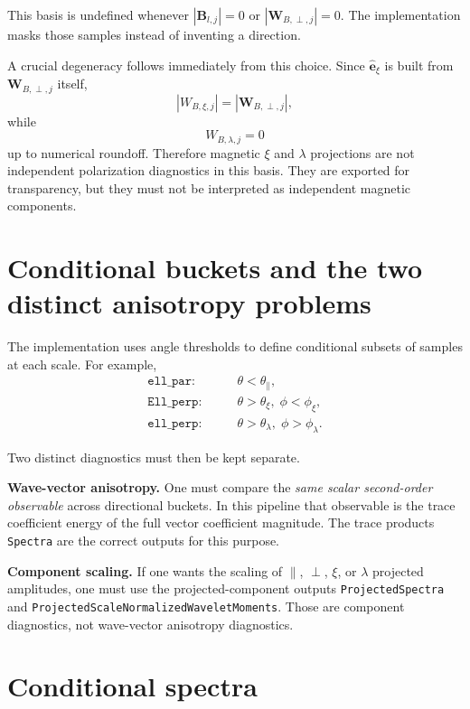 \documentclass[11pt]{article}
\begin{document}
This basis is undefined whenever $|\mathbf{B}_{l,j}|=0$ or $|\mathbf{W}_{B,\perp,j}|=0$. The implementation masks those samples instead of inventing a direction.

A crucial degeneracy follows immediately from this choice. Since $\hat{\mathbf e}_{\xi}$ is built from $\mathbf{W}_{B,\perp,j}$ itself,
\begin{equation}
 |W_{B,\xi,j}| = |\mathbf{W}_{B,\perp,j}|,
\end{equation}
while
\begin{equation}
 W_{B,\lambda,j} = 0
\end{equation}
up to numerical roundoff. Therefore magnetic $\xi$ and $\lambda$ projections are not independent polarization diagnostics in this basis. They are exported for transparency, but they must not be interpreted as independent magnetic components.

\section{Conditional buckets and the two distinct anisotropy problems}

The implementation uses angle thresholds to define conditional subsets of samples at each scale. For example,
\begin{align}
 \texttt{ell\_par}: &\qquad \theta < \theta_{\parallel},\\
 \texttt{Ell\_perp}: &\qquad \theta > \theta_{\xi},\; \phi < \phi_{\xi},\\
 \texttt{ell\_perp}: &\qquad \theta > \theta_{\lambda},\; \phi > \phi_{\lambda}.
\end{align}

Two distinct diagnostics must then be kept separate.

\textbf{Wave-vector anisotropy.} One must compare the \emph{same scalar second-order observable} across directional buckets. In this pipeline that observable is the trace coefficient energy of the full vector coefficient magnitude. The trace products \texttt{Spectra} are the correct outputs for this purpose.

\textbf{Component scaling.} If one wants the scaling of $\parallel$, $\perp$, $\xi$, or $\lambda$ projected amplitudes, one must use the projected-component outputs \texttt{ProjectedSpectra} and \texttt{ProjectedScaleNormalizedWaveletMoments}. Those are component diagnostics, not wave-vector anisotropy diagnostics.

\section{Conditional spectra}
\end{document}
